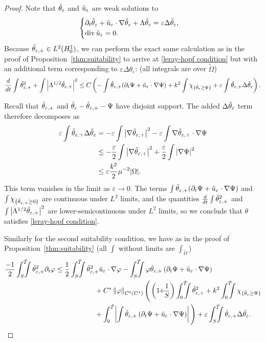 \documentclass[11pt]{amsart}
\theoremstyle{remark}
\theoremstyle{definition}
\newcommand{\eps}{\varepsilon}
\newcommand{\norm}[1]{\left\lVert#1\right\rVert}
\newcommand{\paren}[1]{\left( #1 \right)}
\newcommand{\abs}[1]{\left\lvert #1 \right\rvert}
\newcommand{\del}{\partial}
\newcommand{\grad}{\nabla}
\newcommand{\ddt}{\frac{d}{dt}}
\renewcommand{\div}{\operatorname{div}}
\newcommand{\Laplace}{\Delta}
\newcommand{\indic}[1]{\chi_{\{#1\}}}
\newcommand{\Csuit}{C^\ast}
\begin{document}
\begin{proof}
Note that $\thetae$ and $\ue$ are weak solutions to
\begin{equation} \label{eq:viscous linear}
\begin{cases}
\del_t \thetae + \ue \cdot \grad \thetae + \Lambda \thetae = \eps \Laplace \thetae, \\
\div \ue = 0.
\end{cases}
\end{equation}
Because $\thetaep \in L^2(H_0^1)$, we can perform the exact same calculation as in the proof of Proposition~\ref{thm:suitability} to arrive at \eqref{leray-hopf condition} but with an additional term corresponding to $\eps \Laplace \theta_\eps$: (all integrals are over $\tilde{\Omega}$)
\begin{equation*} \ddt \int \thetaep^2 + \int \abs{\Lambda^{1/2} \thetaep}^2 \leq C \paren{ - \int \thetaep (\del_t\Psi+\ue\cdot\grad\Psi) + k^2 \int \indic{\thetae\geq \Psi}  + \eps \int \thetaep \Laplace \thetae}.
\end{equation*}

Recall that $\thetaep$ and $\thetae - \thetaep - \Psi$ have disjoint support.  The added $\Laplace\thetae$ term therefore decomposes as
\begin{align*} 
\eps \int \thetaep \Laplace \thetae &= -\eps \int \abs{\grad \thetaep}^2 - \eps \int \grad \thetaep \cdot \grad \Psi
\\ &\leq - \frac{\eps}{2} \int \abs{\grad\thetaep}^2 + \frac{\eps}{2} \int \abs{\grad\Psi}^2
\\ &\leq \eps \frac{k^2}{2} \mu^{-2} |\Omega|.
\end{align*}
This term vanishes in the limit as $\eps \to 0$.  The terms $\int \thetaep (\del_t\Psi+\ue\cdot\grad\Psi)$ and $\int \indic{\thetaep\geq 0}$ are continuous under $L^2$ limits, and the quantities $\ddt \int \thetaep^2$ and $\int \abs{\Lambda^{1/2} \thetaep}^2$ are lower-semicontinuous under $L^2$ limits, so we conclude that $\theta$ satisfies \eqref{leray-hopf condition}.  

Similarly for the second suitability condition, we have as in the proof of Proposition~\ref{thm:suitability} (all $\int$ without limits are $\int_{\tilde{\Omega}}$)
\begin{equation} \label{local for eps positive}
\begin{aligned} 
\frac{-1}{2} \int_S^{\tilde{T}}\!\!\!\!\int \thetaep^2 \del_t \varphi &\leq \frac{1}{2} \int_S^{\tilde{T}}\!\!\!\!\int  \thetaep^2 \ue \cdot \grad \varphi - \int_S^{\tilde{T}}\!\!\!\!\int \varphi \thetaep \paren{\del_t \Psi + \ue \cdot \grad \Psi} 
\\ & \hskip2cm + \Csuit \norm{\varphi}_{C^0(C^1)} \Bigg( \paren{1\!\!+\!\!\frac{1}{S}} \int_0^{\tilde{T}}\!\!\!\!\int \thetaep^2 
 + k^2 \int_0^{\tilde{T}}\!\!\!\!\int \indic{\thetae\geq\Psi}
\\ & \hskip2cm + \int_0^{\tilde{T}}\! \abs{\int \thetaep \paren{\del_t \Psi + \ue\cdot\grad\Psi}} \Bigg) 
+ \eps \int_S^{\tilde{T}}\!\!\!\!\int \thetaep \Laplace \thetae.
\end{aligned}
\end{equation} 


\end{proof}
\end{document}
